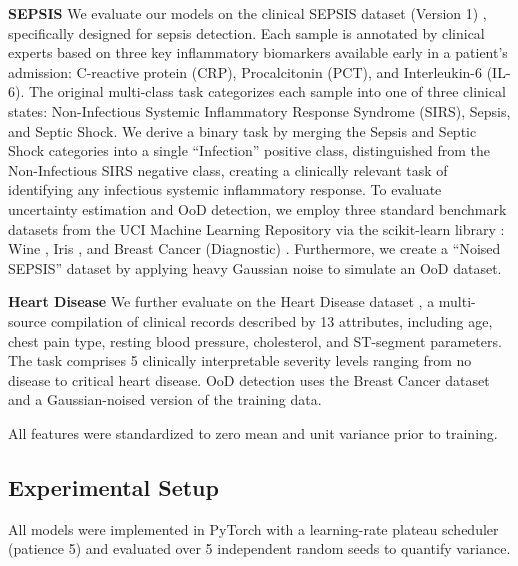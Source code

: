 \documentclass[conference]{IEEEtran}
\begin{document}
\noindent \textbf{SEPSIS} We evaluate our models on the clinical SEPSIS dataset (Version 1) \cite{11087847}, specifically designed for sepsis detection. Each sample is annotated by clinical experts based on three key inflammatory biomarkers available early in a patient's admission: C-reactive protein (CRP), Procalcitonin (PCT), and Interleukin-6 (IL-6). The original multi-class task categorizes each sample into one of three clinical states: Non-Infectious Systemic Inflammatory Response Syndrome (SIRS), Sepsis, and Septic Shock. We derive a binary task by merging the Sepsis and Septic Shock categories into a single ``Infection'' positive class, distinguished from the Non-Infectious SIRS negative class, creating a clinically relevant task of identifying any infectious systemic inflammatory response. To evaluate uncertainty estimation and OoD detection, we employ three standard benchmark datasets from the UCI Machine Learning Repository via the scikit-learn library \cite{pedregosa2011scikit}: Wine \cite{wine_109}, Iris \cite{iris_53}, and Breast Cancer (Diagnostic) \cite{breast_cancer_wisconsin_(diagnostic)_17}. Furthermore, we create a ``Noised SEPSIS'' dataset by applying heavy Gaussian noise to simulate an OoD dataset.

\noindent \textbf{Heart Disease} We further evaluate on the Heart Disease dataset \cite{heart_disease_kaggle}, a multi-source compilation of clinical records described by 13 attributes, including age, chest pain type, resting blood pressure, cholesterol, and ST-segment parameters. The task comprises 5 clinically interpretable severity levels ranging from no disease to critical heart disease. OoD detection uses the Breast Cancer dataset \cite{breast_cancer_wisconsin_(diagnostic)_17} and a Gaussian-noised version of the training data.

All features were standardized to zero mean and unit variance prior to training.


\subsection{Experimental Setup}
All models were implemented in PyTorch with a learning-rate plateau scheduler (patience 5) and evaluated over 5 independent random seeds to quantify variance.
\end{document}
